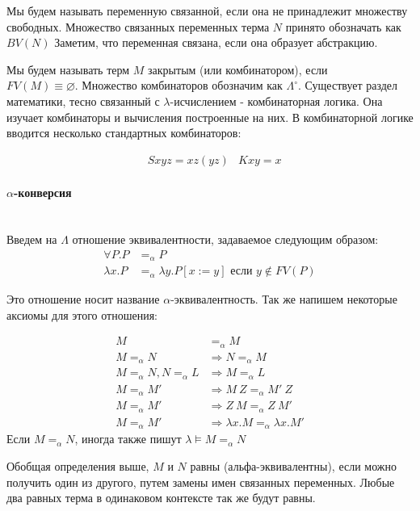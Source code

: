 \documentclass[lambda.tex]{subfiles}
\begin{document}
Мы будем называть переменную связанной, если она не принадлежит множеству свободных. Множество связанных переменных терма $N$ принято обозначать как $BV(N)$ Заметим, что переменная связана, если она образует абстракцию.

Мы будем называть терм $M$ закрытым (или комбинатором), если\\ \(FV(M) \equiv \varnothing\). Множество комбинаторов обозначим как $\Lambda^\circ$. Существует раздел математики, тесно связанный с $\lambda$-исчислением - комбинаторная логика. Она изучает комбинаторы и вычисления построенные на них. В комбинаторной логике вводится несколько стандартных комбинаторов:

\begin{align*}
	&Sxyz = xz(yz)
	&Kxy = x
\end{align*}

\paragraph{$\alpha$-конверсия} %
~\\
\label{par:aplha conversion}
Введем на $\Lambda$ отношение эквивалентности, задаваемое следующим образом:
\begin{align*}
\forall P.P &=_\alpha P\\
\lambda x.P &=_\alpha \lambda y.P[x:=y] \text{ если } y \not\in FV(P)
\end{align*}

Это отношение носит название $\alpha$-эквивалентность. Так же напишем некоторые аксиомы для этого отношения:

\begin{align*}
M &=_\alpha M\\
M =_\alpha N &\Rightarrow N =_\alpha M\\
M =_\alpha N, N =_\alpha L &\Rightarrow M =_\alpha L\\
M =_\alpha M' &\Rightarrow M\ Z =_\alpha M'\ Z\\
M =_\alpha M' &\Rightarrow Z\ M =_\alpha Z\ M'\\
M =_\alpha M' &\Rightarrow \lambda x.M =_\alpha \lambda x.M'
\end{align*}
Если $M =_\alpha N$, иногда также пишут $\lambda\models M =_\alpha N$


Обобщая определения выше, $M$ и $N$ равны (альфа-эквивалентны), если можно получить один из другого, путем замены имен связанных переменных. Любые два равных терма в одинаковом контексте так же будут равны.
\end{document}
